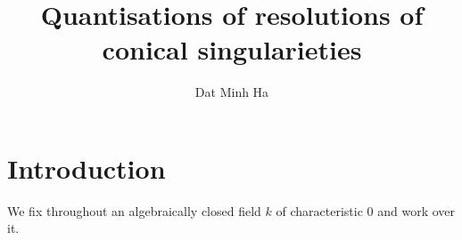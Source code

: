 

\setcounter{section}{-1}





    \title{Quantisations of resolutions of conical singularieties}
    
    \author{Dat Minh Ha}
    \maketitle
    
    \begin{abstract}
        
    \end{abstract}
    
    {
      \hypersetup{} 
      \tableofcontents %
    }

    \section{Introduction}
        \begin{convention}
            We fix throughout an algebraically closed field $k$ of characteristic $0$ and work over it. 
        \end{convention}


